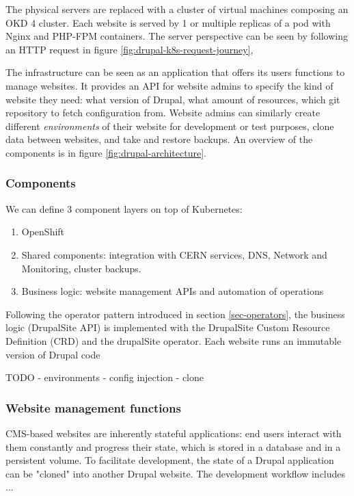 The physical servers are replaced with a cluster of virtual machines composing an OKD 4 cluster.
Each website is served by 1 or multiple replicas of a pod with Nginx and PHP-FPM containers.
The server perspective can be seen by following an HTTP request in figure \ref{fig:drupal-k8s-request-journey},

The infrastructure can be seen as an application that offers its users functions to manage websites.
It provides an API for website admins to specify the kind of website they need: what version of Drupal, what amount of resources, which git repository to fetch configuration from.
Website admins can similarly create different \emph{environments} of their website for development or test purposes,
clone data between websites, and take and restore backups.
An overview of the components is in figure \ref{fig:drupal-architecture}.

\subsubsection{Components}

We can define 3 component layers on top of Kubernetes:
\begin{enumerate}
    \item OpenShift
    \item Shared components: integration with CERN services, DNS, Network and Monitoring, cluster backups.
    \item Business logic: website management APIs and automation of operations
\end{enumerate}

Following the operator pattern introduced in section \ref{sec-operators}, the business logic (DrupalSite API) is implemented with the DrupalSite Custom Resource Definition (CRD) and the drupalSite operator.
Each website runs an immutable version of Drupal code

TODO
- environments
- config injection
- clone






\subsubsection*{Website management functions}


CMS-based websites are inherently stateful applications: end users interact with them constantly and progress their state,
which is stored in a database and in a persistent volume.
To facilitate development, the state of a Drupal application can be "cloned" into another Drupal website.
The development workflow includes ... %

